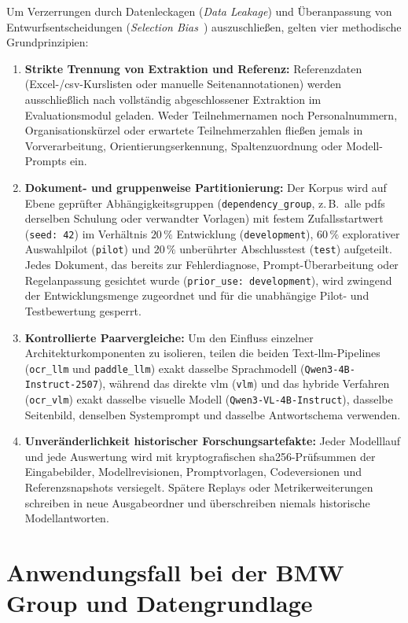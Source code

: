 Um Verzerrungen durch Datenleckagen (\emph{Data Leakage}) und Überanpassung von Entwurfsentscheidungen (\emph{Selection Bias}~\cite{Cawley2010SelectionBias}) auszuschließen, gelten vier methodische Grundprinzipien:
\begin{enumerate}
  \item \textbf{Strikte Trennung von Extraktion und Referenz:} Referenzdaten (Excel-/\ac{csv}-Kurslisten oder manuelle Seitenannotationen) werden ausschließlich nach vollständig abgeschlossener Extraktion im Evaluationsmodul geladen. Weder Teilnehmernamen noch Personalnummern, Organisationskürzel oder erwartete Teilnehmerzahlen fließen jemals in Vorverarbeitung, Orientierungserkennung, Spaltenzuordnung oder Modell-Prompts ein.
  \item \textbf{Dokument- und gruppenweise Partitionierung:} Der Korpus wird auf Ebene geprüfter Abhängigkeitsgruppen (\texttt{dependency\_group}, z.\,B.\ alle \acp{pdf} derselben Schulung oder verwandter Vorlagen) mit festem Zufallsstartwert (\texttt{seed: 42}) im Verhältnis $20\,\%$ Entwicklung (\texttt{development}), $60\,\%$ explorativer Auswahlpilot (\texttt{pilot}) und $20\,\%$ unberührter Abschlusstest (\texttt{test}) aufgeteilt. Jedes Dokument, das bereits zur Fehlerdiagnose, Prompt-Überarbeitung oder Regelanpassung gesichtet wurde (\texttt{prior\_use: development}), wird zwingend der Entwicklungsmenge zugeordnet und für die unabhängige Pilot- und Testbewertung gesperrt.
  \item \textbf{Kontrollierte Paarvergleiche:} Um den Einfluss einzelner Architekturkomponenten zu isolieren, teilen die beiden Text-\ac{llm}-Pipelines (\texttt{ocr\_llm} und \texttt{paddle\_llm}) exakt dasselbe Sprachmodell (\texttt{Qwen3-4B-Instruct-2507}), während das direkte \ac{vlm} (\texttt{vlm}) und das hybride Verfahren (\texttt{ocr\_vlm}) exakt dasselbe visuelle Modell (\texttt{Qwen3-VL-4B-Instruct}), dasselbe Seitenbild, denselben Systemprompt und dasselbe Antwortschema verwenden.
  \item \textbf{Unveränderlichkeit historischer Forschungsartefakte:} Jeder Modelllauf und jede Auswertung wird mit kryptografischen \ac{sha256}-Prüfsummen der Eingabebilder, Modellrevisionen, Promptvorlagen, Codeversionen und Referenzsnapshots versiegelt. Spätere Replays oder Metrikerweiterungen schreiben in neue Ausgabeordner und überschreiben niemals historische Modellantworten.
\end{enumerate}

\section{Anwendungsfall bei der BMW Group und Datengrundlage}
\label{sec:datengrundlage}

